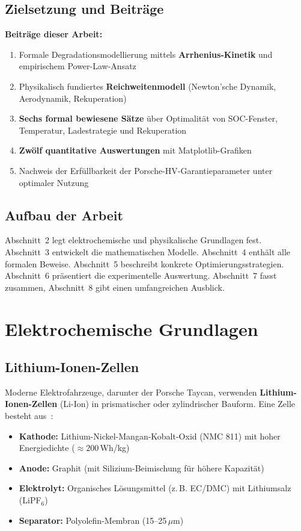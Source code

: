 ﻿\documentclass[a4paper,12pt]{article}
\theoremstyle{definition}
\begin{document}
\subsection{Zielsetzung und Beitr\"age}

\textbf{Beitr\"age dieser Arbeit:}
\begin{enumerate}
  \item Formale Degradationsmodellierung mittels \textbf{Arrhenius-Kinetik}
    und empirischem Power-Law-Ansatz
  \item Physikalisch fundiertes \textbf{Reichweitenmodell} (Newton'sche Dynamik,
    Aerodynamik, Rekuperation)
  \item \textbf{Sechs formal bewiesene S\"atze} \"uber Optimalit\"at von
    SOC-Fenster, Temperatur, Ladestrategie und Rekuperation
  \item \textbf{Zwölf quantitative Auswertungen} mit Matplotlib-Grafiken
  \item Nachweis der Erf\"ullbarkeit der Porsche-HV-Garantieparameter
    unter optimaler Nutzung
\end{enumerate}

\subsection{Aufbau der Arbeit}

Abschnitt~2 legt elektrochemische und physikalische Grundlagen fest.
Abschnitt~3 entwickelt die mathematischen Modelle.
Abschnitt~4 enth\"alt alle formalen Beweise.
Abschnitt~5 beschreibt konkrete Optimierungsstrategien.
Abschnitt~6 pr\"asentiert die experimentelle Auswertung.
Abschnitt~7 fasst zusammen, Abschnitt~8 gibt einen umfangreichen Ausblick.

\section{Elektrochemische Grundlagen}

\subsection{Lithium-Ionen-Zellen}

Moderne Elektrofahrzeuge, darunter der Porsche Taycan, verwenden
\textbf{Lithium-Ionen-Zellen} (Li-Ion) in prismatischer oder zylindrischer
Bauform. Eine Zelle besteht aus~\cite{Vetter2005}:
\begin{itemize}
  \item \textbf{Kathode:} Lithium-Nickel-Mangan-Kobalt-Oxid (NMC 811)
    mit hoher Energiedichte ($\approx 200$\,Wh/kg)
  \item \textbf{Anode:} Graphit (mit Silizium-Beimischung für h\"ohere Kapazit\"at)
  \item \textbf{Elektrolyt:} Organisches L\"osungsmittel (z.\,B. EC/DMC)
    mit Lithiumsalz (LiPF$_6$)
  \item \textbf{Separator:} Polyolefin-Membran (15--25\,\(\mu\)m)
\end{itemize}
\end{document}
